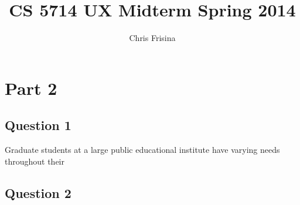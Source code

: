 \documentclass[11pt]{article}
\begin{document}
\title{CS 5714 UX Midterm Spring 2014}
\author{Chris Frisina}

\section*{Part 2} %
  \subsection{Question 1} 
  Graduate students at a large public educational institute have varying needs throughout their 
  
  \subsection{Question 2}

  
\end{document}
